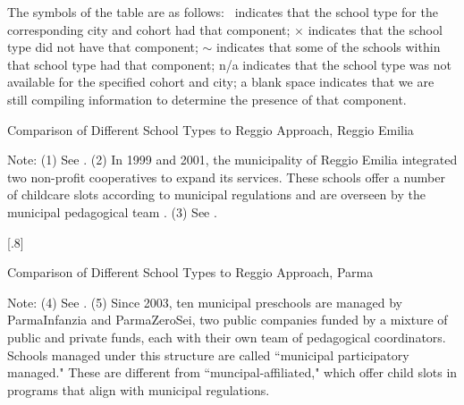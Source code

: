 The symbols of the table are as follows: \checkmark\ indicates that the school type for the corresponding city and cohort had that component; $\times$ indicates that the school type did not have that component; $\sim$ indicates that some of the schools within that school type had that component; n/a indicates that the school type was not available for the specified cohort and city; a blank space indicates that we are still compiling information to determine the presence of that component.
\singlespacing

\begin{table}[htb]
\centering
\scriptsize
\begin{threeparttable}
\caption{Comparison of Different School Types to Reggio Approach, Reggio Emilia}\label{tab:comparisonRE}
	
\begin{tablenotes}
\item Note: (1) See \citet{Rinaldi_2006_ReggioEmilia_BOOK,Giudici-Nicolosi_2014_Reggio-Approach, Cagliari-etal-eds_2016_BOOK_Loris-Malaguzzi}. (2) In 1999 and 2001, the municipality of Reggio Emilia integrated two non-profit cooperatives to expand its services. These schools offer a number of childcare slots according to municipal regulations and are overseen by the municipal pedagogical team \citep{Reggio_2008_Brochure}. (3) See \citet{Giudici-Nicolosi_2014_Reggio-Approach}.
\end{tablenotes}
\end{threeparttable}
\end{table}

\begin{table}[htb]
\centering
\scriptsize
\scalebox{.8}[.8]{
\begin{threeparttable}
\caption{Comparison of Different School Types to Reggio Approach, Parma}\label{tab:comparisonPar}
	
\begin{tablenotes}
\item Note: (4) See \citet{Parma_Commune_2014}. (5) Since 2003, ten municipal preschools are managed by ParmaInfanzia and ParmaZeroSei, two public companies funded by a mixture of public and private funds, each with their own team of pedagogical coordinators. Schools managed under this structure are called ``municipal participatory managed." These are different from ``muncipal-affiliated," which offer child slots in programs that align with municipal regulations.
\end{tablenotes}
\end{threeparttable}}
\end{table}
\restoregeometry

